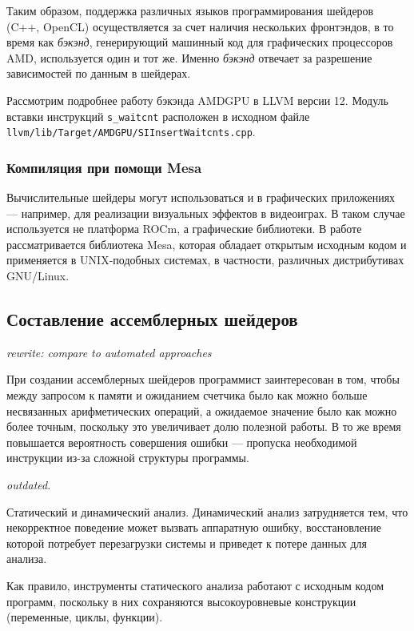 \documentclass[a4paper,14pt]{extarticle}
\begin{document}
Таким образом, поддержка различных языков программирования шейдеров (C++, OpenCL)
осуществляется за счет наличия нескольких фронтэндов, в то время как \textit{бэкэнд},
генерирующий машинный код для графических процессоров AMD, используется один и тот же.
Именно \textit{бэкэнд} отвечает за разрешение зависимостей по данным в шейдерах.

Рассмотрим подробнее работу бэкэнда AMDGPU в LLVM версии 12. Модуль вставки
инструкций \texttt{s\_waitcnt} расположен в исходном файле
\texttt{llvm/\-lib/\-Target/\-AMDGPU/\-SIInsertWaitcnts.cpp}. 


\subsubsection{Компиляция при помощи Mesa}

Вычислительные шейдеры могут использоваться и в графических приложениях — например,
для реализации визуальных эффектов в видеоиграх. В таком случае используется
не платформа ROCm, а графические библиотеки. В работе рассматривается библиотека
Mesa, которая обладает открытым исходным кодом и применяется в UNIX-подобных
системах, в частности, различных дистрибутивах GNU/Linux.

\subsection{Составление ассемблерных шейдеров}

\textit{rewrite: compare to automated approaches}

При создании ассемблерных шейдеров программист заинтересован в том,
чтобы между запросом к памяти и ожиданием счетчика было как можно больше несвязанных
арифметических операций, а ожидаемое значение было как можно более точным, поскольку
это увеличивает долю полезной работы. В то же время повышается вероятность совершения
ошибки — пропуска необходимой инструкции из-за сложной структуры программы.

\textit{outdated}.

Статический и динамический анализ. Динамический анализ затрудняется тем, что некорректное
поведение может вызвать аппаратную ошибку, восстановление которой потребует перезагрузки
системы и приведет к потере данных для анализа.  %

Как правило, инструменты статического анализа работают с исходным кодом программ,
поскольку в них сохраняются высокоуровневые конструкции (переменные, циклы, функции).
\end{document}
